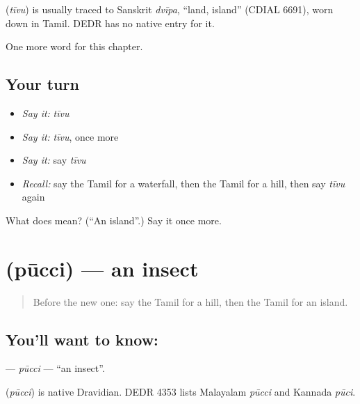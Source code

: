 \begin{cousinweb}
\textbf{} (\emph{tīvu}) is usually traced to Sanskrit \emph{dvīpa}, \textquotedblleft{}land, island\textquotedblright{} (CDIAL 6691), worn down in Tamil. DEDR has no native entry for it.
\end{cousinweb}

\begin{grammarlens}[title={What you've built}]
One more word for this chapter.
\end{grammarlens}

\subsection*{Your turn}
\begin{itemize}
\raggedright
  \item \emph{Say it:} \emph{tīvu}
  \item \emph{Say it:} \emph{tīvu}, once more
  \item \emph{Say it:} say \emph{tīvu}
  \item \emph{Recall:} say the Tamil for a waterfall, then the Tamil for a hill, then say \emph{tīvu} again
\end{itemize}

\begin{tcolorbox}[breakable,colback=teal!4,colframe=teal!35!black,title={Before you move on}]
What does  mean? (\textquotedblleft{}An island\textquotedblright{}.) Say it once more.
\end{tcolorbox}
\section[\texorpdfstring{\ta{பூச்சி} (pūcci)}{பூச்சி (pūcci)}]{ (pūcci) — an insect}

\label{lesson:TA-C141-pucci}



\begin{quote}
Before the new one: say the Tamil for a hill, then the Tamil for an island.
\end{quote}

\subsection*{You'll want to know: }
\textbf{} — \emph{pūcci} — \textquotedblleft{}an insect\textquotedblright{}.

\begin{cousinweb}
\textbf{} (\emph{pūcci}) is native Dravidian. DEDR 4353 lists Malayalam \emph{pūcci} and Kannada \emph{pūci}.
\end{cousinweb}

